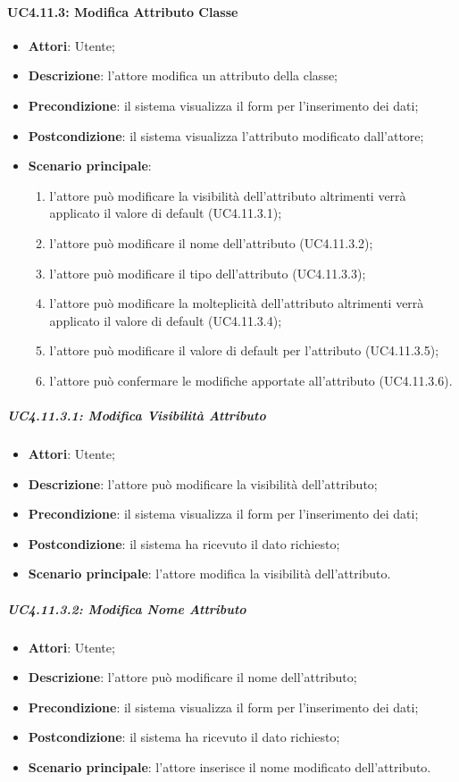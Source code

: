 \paragraph{UC4.11.3: Modifica Attributo Classe}
\label{UC4.11.3}
\begin{itemize}
\item \textbf{Attori}: Utente;
\item \textbf{Descrizione}: l'attore modifica un attributo della classe;	
\item \textbf{Precondizione}: il sistema visualizza il form per l'inserimento dei dati;	
\item \textbf{Postcondizione}: il sistema visualizza l'attributo modificato dall'attore;	
\item \textbf{Scenario principale}:
\begin{enumerate}
\item l'attore può modificare la visibilità dell'attributo altrimenti verrà applicato il valore di default (UC4.11.3.1);
\item l'attore può modificare il nome dell'attributo (UC4.11.3.2);
\item l'attore può modificare il tipo dell'attributo (UC4.11.3.3);
\item l'attore può modificare la molteplicità dell'attributo altrimenti verrà applicato il valore di default (UC4.11.3.4);
\item l'attore può modificare il valore di default per l'attributo (UC4.11.3.5);
\item l'attore può confermare le modifiche apportate all'attributo (UC4.11.3.6).
\end{enumerate}
\end{itemize}

\subparagraph{UC4.11.3.1: Modifica Visibilità Attributo}
\label{UC4.11.3.1}
\begin{itemize}
\item \textbf{Attori}: Utente;
\item \textbf{Descrizione}: l'attore può modificare la visibilità dell'attributo;	
\item \textbf{Precondizione}: il sistema visualizza il form per l'inserimento dei dati;	
\item \textbf{Postcondizione}: il sistema ha ricevuto il dato richiesto;	
\item \textbf{Scenario principale}:
l'attore modifica la visibilità dell'attributo.
\end{itemize}

\subparagraph{UC4.11.3.2: Modifica Nome Attributo}
\label{UC4.11.3.2}
\begin{itemize}
\item \textbf{Attori}: Utente;
\item \textbf{Descrizione}: l'attore può modificare il nome dell'attributo;	
\item \textbf{Precondizione}: il sistema visualizza il form per l'inserimento dei dati;	
\item \textbf{Postcondizione}: il sistema ha ricevuto il dato richiesto;	
\item \textbf{Scenario principale}:
l'attore inserisce il nome modificato dell'attributo.	
\end{itemize}

